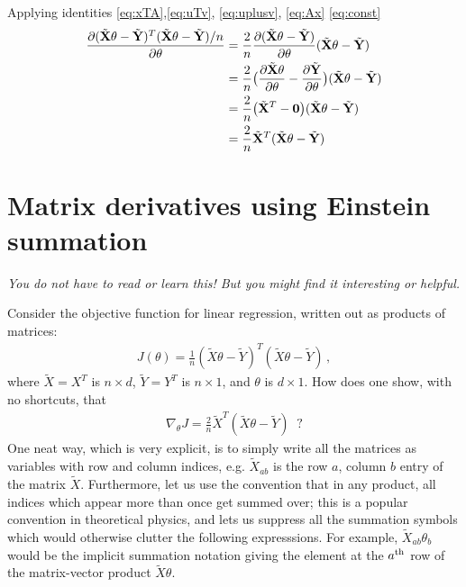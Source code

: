 \newcommand{\xmt}{\tilde{\bf X}}
\newcommand{\ymt}{\tilde{\bf Y}}

    
Applying identities \ref{eq:xTA},\ref{eq:uTv}, \ref{eq:uplusv}, \ref{eq:Ax}
\ref{eq:const}
\begin{align*}
   \frac{\partial (\xmt \theta - \ymt)^T(\xmt \theta - \ymt)/n}{\partial
  \theta} & = \frac{2}{n} \frac{\partial(\xmt \theta - \ymt)}{\partial
            \theta}(\xmt \theta - \ymt)\\
    & = \frac{2}{n} \big(\frac{\partial\xmt \theta}{\partial
            \theta}-\frac{\partial \ymt}{\partial
            \theta}\big)(\xmt \theta - \ymt)\\
    & = \frac{2}{n} \big(\xmt^T -{\bf 0}\big)(\xmt \theta - \ymt)\\
    & = \frac{2}{n} \xmt^T (\xmt \theta - \ymt)\\
 \end{align*}


\section{Matrix derivatives using Einstein summation}
\label{app:einstein}

{\em You do not have to read or learn this!  But you might find it
  interesting or helpful.}

\def\bea{\begin{eqnarray}}
\def\eea{\end{eqnarray}}
\def\Xt{\tilde{X}}
\def\Yt{\tilde{Y}}

Consider the objective function for linear regression, written out as products of matrices:
\bea
J(\theta) = \frac{1}{n} (\Xt\theta - \Yt)^T (\Xt\theta-\Yt)
\,,
\eea
where $\Xt = X^T$ is $n\times d$, $\Yt=Y^T$ is $n\times 1$, and $\theta$ is $d\times 1$.  How does one show, with no shortcuts, that
\bea
	\nabla_{\theta}J = \frac{2}{n} {\Xt^T} {(\Xt\theta - \Yt)} \;\;?
\eea
One neat way, which is very explicit, is to simply write all the
matrices as variables with row and column indices, e.g. $\Xt_{ab}$ is
the row $a$, column $b$ entry of the matrix $\Xt$.  Furthermore, let
us use the convention that in any product, all indices which appear
more than once get summed over; this is a popular convention in
theoretical physics, and lets us suppress all the summation symbols
which would otherwise clutter the following expresssions.  For
example, $\Xt_{ab} \theta_b$ would be the implicit summation notation
giving the element at the $a^{\rm th}$ row of the matrix-vector
product $\Xt \theta$.

